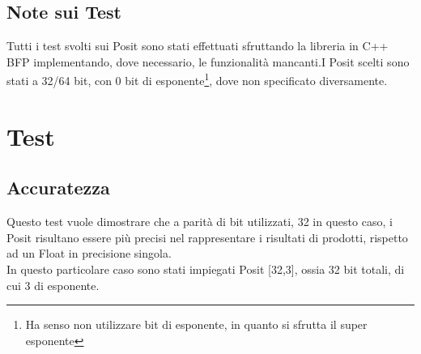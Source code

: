 \documentclass[a4paper,11pt]{article}
\begin{document}
	\subsection{Note sui Test}
	Tutti i test svolti sui Posit sono stati effettuati sfruttando la libreria in C++ BFP\cite{libbfp} 
	implementando, dove necessario, le funzionalità mancanti.\newline I Posit scelti sono stati a 32/64 bit, con 0 bit di esponente\footnote{Ha senso non utilizzare bit di esponente, in quanto si sfrutta il super esponente}, dove non specificato diversamente.
	
\newpage
\section {Test}
\subsection{Accuratezza}

Questo test vuole dimostrare che a parità di bit utilizzati, 32 in questo caso, i Posit risultano essere più precisi nel rappresentare i risultati di prodotti, rispetto ad un Float in precisione singola.\\
In questo particolare caso sono stati impiegati Posit [32,3], ossia 32 bit totali, di cui 3 di esponente.
\end{document}
